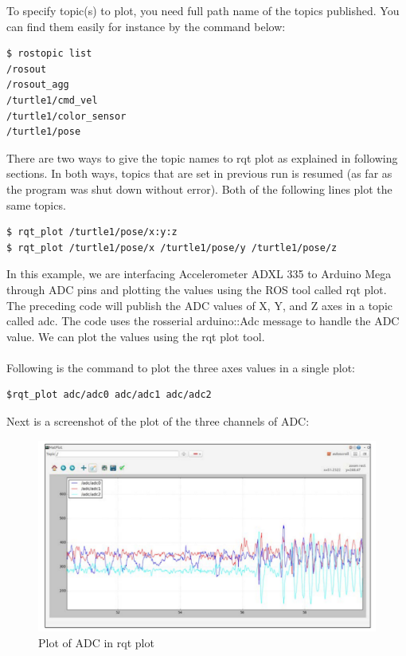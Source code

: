To specify topic(s) to plot, you need full path name of the topics published. You can find them easily for instance by the command below:
\begin{lstlisting}[language=terCmd]
$ rostopic list
/rosout        
/rosout_agg
/turtle1/cmd_vel
/turtle1/color_sensor
/turtle1/pose
\end{lstlisting}
There are two ways to give the topic names to rqt plot as explained in following sections. In both ways, topics that are set in previous run is resumed (as far as the program was shut down without error).
Both of the following lines plot the same topics.
\begin{lstlisting}[language=terCmd]
$ rqt_plot /turtle1/pose/x:y:z
$ rqt_plot /turtle1/pose/x /turtle1/pose/y /turtle1/pose/z
\end{lstlisting}
In this example, we are interfacing Accelerometer ADXL 335 to Arduino Mega through ADC pins and plotting the values using the ROS tool called rqt plot.
The preceding code will publish the ADC values of X, Y, and Z axes in a topic called adc. The code uses the rosserial arduino::Adc message to handle the ADC value. We can plot the values using the rqt plot tool.
\\\\Following is the command to plot the three axes values in a single plot:
\begin{lstlisting}[language=terCmd] 
$rqt_plot adc/adc0 adc/adc1 adc/adc2
\end{lstlisting}
Next is a screenshot of the plot of the three channels of ADC:
\begin{figure}[H]
	\centering
	\includegraphics[width =.8\textwidth]{figures/ADC}
	\caption{Plot of ADC in rqt plot}
	\label{Fig:ADC}
\end{figure}
